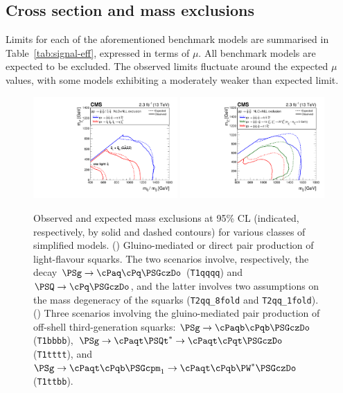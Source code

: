 \subsection{Cross section and mass exclusions}


Limits for each of the aforementioned benchmark models are summarised
in Table~\ref{tab:signal-eff}, expressed in terms of $\mu$. All
benchmark models are expected to be excluded. The observed limits
fluctuate around the expected $\mu$ values, with some models
exhibiting a moderately weaker than expected limit.

\begin{figure}[htb!]
  \centering
    \includegraphics[width=0.49\textwidth]{Figure_007-a.pdf}
    \includegraphics[width=0.49\textwidth]{Figure_007-b.pdf}
    \caption{Observed and expected mass exclusions at 95\% CL
      (indicated, respectively, by solid and dashed contours) for
      various classes of simplified models. (\cmsLeft) Gluino-mediated or
      direct pair production of light-flavour squarks. The two
      scenarios involve, respectively, the decay
      $\PSg\to \cPaq\cPq\PSGczDo$ (\texttt{T1qqqq}) and
      $\PSQ\to \cPq\PSGczDo$, and the latter involves two assumptions on
      the mass degeneracy of the squarks (\texttt{T2qq\_8fold} and
      \texttt{T2qq\_1fold}). (\cmsRight) Three scenarios involving the
      gluino-mediated pair production of off-shell third-generation
      squarks: $\PSg\to \cPaqb\cPqb\PSGczDo$ (\texttt{T1bbbb}),
      $\PSg\to \cPaqt\PSQt^*\to \cPaqt\cPqt\PSGczDo$ (\texttt{T1tttt}),
      and $\PSg\to \cPaqt\cPqb\PSGcpm_1\to \cPaqt\cPqb\PW^*\PSGczDo$
      (\texttt{T1ttbb}).  }
    \label{fig:limits-sms-1}
\end{figure}

